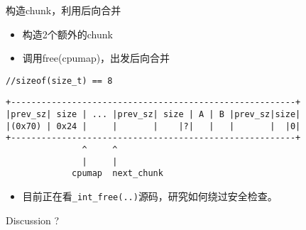 \documentclass[t]{beamer}
\begin{document}
\begin{frame}[fragile]{\kaishu 构造chunk，利用后向合并}
\begin{itemize}
  \item 构造2个额外的chunk
  \item 调用free(cpumap)，出发后向合并
\end{itemize}
\begin{lstlisting}
//sizeof(size_t) == 8
\end{lstlisting}
{\small \begin{verbatim}
+--------------------------------------------------------+
|prev_sz| size | ... |prev_sz| size | A | B |prev_sz|size|
|(0x70) | 0x24 |     |       |    |?|   |   |       |  |0|
+--------------------------------------------------------+
               ^     ^
               |     |
             cpumap  next_chunk
\end{verbatim}}
\begin{itemize}
  \item 目前正在看\texttt{\_int\_free(..)}源码，研究如何绕过安全检查。
\end{itemize}
\end{frame}

\begin{frame}{Discussion}
?
\end{frame}
\end{document}

